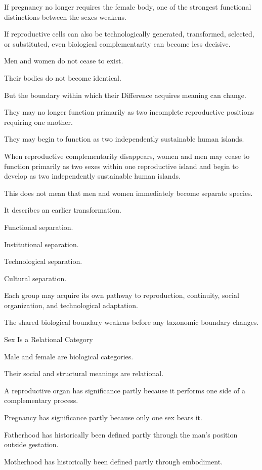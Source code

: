 If pregnancy no longer requires the female body, one of the strongest functional distinctions between the sexes weakens.

If reproductive cells can also be technologically generated, transformed, selected, or substituted, even biological complementarity can become less decisive.

Men and women do not cease to exist.

Their bodies do not become identical.

But the boundary within which their Difference acquires meaning can change.

They may no longer function primarily as two incomplete reproductive positions requiring one another.

They may begin to function as two independently sustainable human islands.

When reproductive complementarity disappears, women and men may cease to function primarily as two sexes within one reproductive island and begin to develop as two independently sustainable human islands.

This does not mean that men and women immediately become separate species.

It describes an earlier transformation.

Functional separation.

Institutional separation.

Technological separation.

Cultural separation.

Each group may acquire its own pathway to reproduction, continuity, social organization, and technological adaptation.

The shared biological boundary weakens before any taxonomic boundary changes.

Sex Is a Relational Category

Male and female are biological categories.

Their social and structural meanings are relational.

A reproductive organ has significance partly because it performs one side of a complementary process.

Pregnancy has significance partly because only one sex bears it.

Fatherhood has historically been defined partly through the man’s position outside gestation.

Motherhood has historically been defined partly through embodiment.

